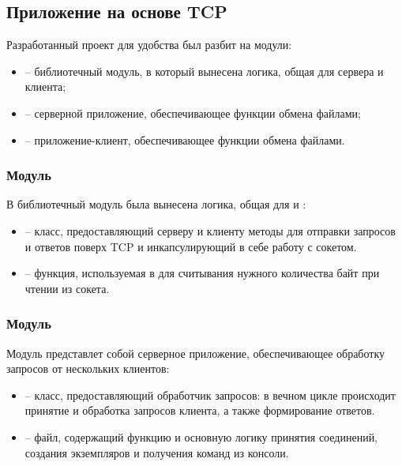 \subsection{Приложение на основе TCP}

Разработанный проект  для удобства был разбит на модули:
\begin{itemize}
	\item {} -- библиотечный модуль, в который вынесена логика, общая для сервера и клиента;
	\item {} -- серверной приложение, обеспечивающее функции обмена файлами;
	\item {} -- приложение-клиент, обеспечивающее функции обмена файлами.
\end{itemize}

\subsubsection{Модуль }

В библиотечный модуль  была вынесена логика, общая для  и :
\begin{itemize}
	\item {} -- класс, предоставляющий серверу и клиенту методы для отправки запросов и ответов поверх TCP и инкапсулирующий в себе работу с сокетом.
	\item {} -- функция, используемая в  для считывания нужного количества байт при чтении из сокета.

\end{itemize}

\subsubsection{Модуль }

Модуль  представлет собой серверное приложение, обеспечивающее обработку запросов от нескольких клиентов:
\begin{itemize}
	\item {} -- класс, предоставляющий обработчик запросов: в вечном цикле происходит принятие и обработка запросов клиента, а также формирование ответов.
	\item {} -- файл, содержащий функцию  и основную логику принятия соединений, создания экземпляров  и получения команд из консоли.
\end{itemize}

